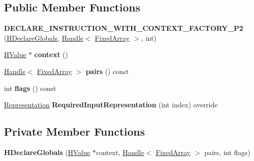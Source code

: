 \subsection*{Public Member Functions}
\begin{DoxyCompactItemize}
\item 
{\bfseries D\+E\+C\+L\+A\+R\+E\+\_\+\+I\+N\+S\+T\+R\+U\+C\+T\+I\+O\+N\+\_\+\+W\+I\+T\+H\+\_\+\+C\+O\+N\+T\+E\+X\+T\+\_\+\+F\+A\+C\+T\+O\+R\+Y\+\_\+\+P2} (\hyperlink{classv8_1_1internal_1_1_h_declare_globals}{H\+Declare\+Globals}, \hyperlink{classv8_1_1internal_1_1_handle}{Handle}$<$ \hyperlink{classv8_1_1internal_1_1_fixed_array}{Fixed\+Array} $>$, int)\hypertarget{classv8_1_1internal_1_1_h_declare_globals_a54956e8b36123d25191dded258f920f5}{}\label{classv8_1_1internal_1_1_h_declare_globals_a54956e8b36123d25191dded258f920f5}

\item 
\hyperlink{classv8_1_1internal_1_1_h_value}{H\+Value} $\ast$ {\bfseries context} ()\hypertarget{classv8_1_1internal_1_1_h_declare_globals_a39bbf4355476931d33ccb2305e37090c}{}\label{classv8_1_1internal_1_1_h_declare_globals_a39bbf4355476931d33ccb2305e37090c}

\item 
\hyperlink{classv8_1_1internal_1_1_handle}{Handle}$<$ \hyperlink{classv8_1_1internal_1_1_fixed_array}{Fixed\+Array} $>$ {\bfseries pairs} () const \hypertarget{classv8_1_1internal_1_1_h_declare_globals_a20ec2e7dd3d5b54dba5eb5e3c6850f7a}{}\label{classv8_1_1internal_1_1_h_declare_globals_a20ec2e7dd3d5b54dba5eb5e3c6850f7a}

\item 
int {\bfseries flags} () const \hypertarget{classv8_1_1internal_1_1_h_declare_globals_a171b613587b2b81ae9cd06be32c586bb}{}\label{classv8_1_1internal_1_1_h_declare_globals_a171b613587b2b81ae9cd06be32c586bb}

\item 
\hyperlink{classv8_1_1internal_1_1_representation}{Representation} {\bfseries Required\+Input\+Representation} (int index) override\hypertarget{classv8_1_1internal_1_1_h_declare_globals_a13f4cd4b564e5dfec1da75e58197d867}{}\label{classv8_1_1internal_1_1_h_declare_globals_a13f4cd4b564e5dfec1da75e58197d867}

\end{DoxyCompactItemize}
\subsection*{Private Member Functions}
\begin{DoxyCompactItemize}
\item 
{\bfseries H\+Declare\+Globals} (\hyperlink{classv8_1_1internal_1_1_h_value}{H\+Value} $\ast$context, \hyperlink{classv8_1_1internal_1_1_handle}{Handle}$<$ \hyperlink{classv8_1_1internal_1_1_fixed_array}{Fixed\+Array} $>$ pairs, int flags)\hypertarget{classv8_1_1internal_1_1_h_declare_globals_a4a5682842dd9e961421d9ab7e03721aa}{}\label{classv8_1_1internal_1_1_h_declare_globals_a4a5682842dd9e961421d9ab7e03721aa}

\end{DoxyCompactItemize}
